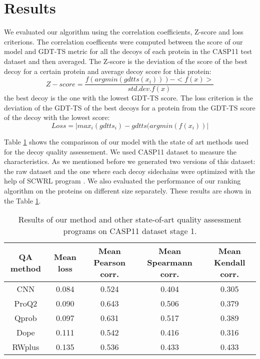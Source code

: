 \documentclass[a4paper,10pt]{article}
\begin{document}
\section{Results}
We evaluated our algorithm using the correlation coefficients, Z-score and loss criterions. The correlation coefficents were computed between the score of 
our model and GDT-TS metric for all the decoys of each protein in the CASP11 test dataset and then averaged. The Z-score is the deviation of the score of 
the best decoy for a certain protein and average decoy score for this protein:
$$ 
Z-score = \frac{f( argmin(gdtts(x_i)) ) - <f(x)>}{std.dev.f(x)}
$$ 
the best decoy is the one with the lowest GDT-TS score. 
The loss criterion is the deviation of the GDT-TS of the best decoys for a protein from the GDT-TS score of the decoy with the lowest score:
$$ 
Loss = | max_i( gdtts_i ) - gdtts( argmin(f(x_i) ) |
$$ 

Table \ref{} shows the comparisson of our model with the state of art methods used for the decoy quality assessement. We used CASP11 dataset to measure the 
characteristics. As we mentioned before we generated two versions of this dataset: the raw dataset and the one where each decoy sidechains were optimized with 
the help of SCWRL program \cite{}. We also evaluated the performance of our ranking algorithm on the proteins on different size separately. These results are shown 
in the Table \ref{}. 

\begin{table}[H]
\begin{center}
\begin{tabular}{ c | c | c | c | c }
    
    QA method & Mean loss & Mean Pearson corr. & Mean Spearmann corr. & Mean Kendall corr. \\
    \hline
    CNN     &0.084 &0.524 &0.404 &0.305 \\ \hline
    ProQ2   &0.090 &0.643 &0.506 &0.379 \\ \hline
    Qprob   &0.097 &0.631 &0.517 &0.389 \\ \hline
    Dope    &0.111 &0.542 &0.416 &0.316 \\ \hline
    RWplus  &0.135 &0.536 &0.433 &0.433 \\ \hline
\end{tabular}
    
    \caption {Results of our method and other state-of-art quality assessment programs on CASP11 dataset stage 1.}
    \label{Tbl:optParams}
\end{center}
\end{table}
\end{document}

